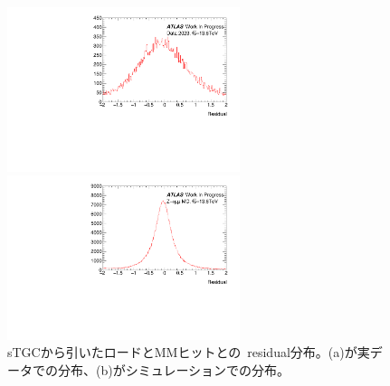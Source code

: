 \begin{figure}[h]
        \begin{minipage}[b]{0.48\linewidth}
            \centering
            \includegraphics[clip, width=6.8cm]{fig/5/residualNewAlg_mm.pdf}
        \end{minipage}
        \begin{minipage}[b]{0.48\linewidth}
            \centering
            \includegraphics[clip, width=6.8cm]{fig/5/residualNewAlg_mm_MC.pdf}
        \end{minipage}
    \caption{sTGCから引いたロードとMMヒットとの~residual分布。(a)が実データでの分布、(b)がシミュレーションでの分布。}
    \label{fig:mmresidualDataMC}
\end{figure}


